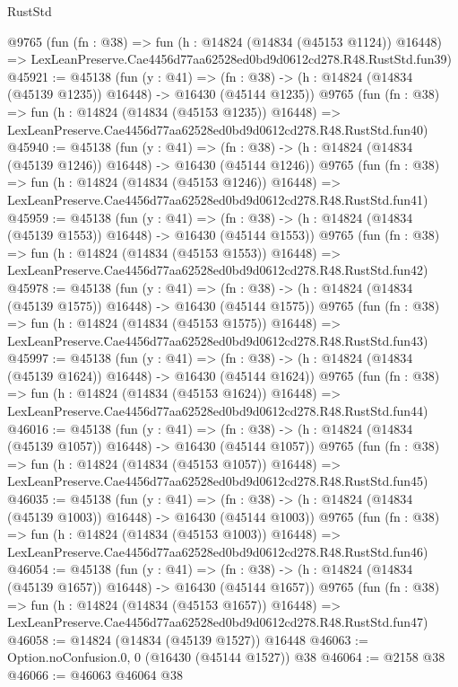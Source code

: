 \begin{lexlean}{RustStd}
\begin{coremodule}
    @9765
    (fun (fn : @38) =>
    fun (h : @14824 (@14834 (@45153 @1124)) @16448) =>
    LexLeanPreserve.Cae4456d77aa62528ed0bd9d0612cd278.R48.RustStd.fun39)
@45921 := @45138
    (fun (y : @41) =>
    (fn : @38) -> (h : @14824 (@14834 (@45139 @1235)) @16448) -> @16430 (@45144 @1235))
    @9765
    (fun (fn : @38) =>
    fun (h : @14824 (@14834 (@45153 @1235)) @16448) =>
    LexLeanPreserve.Cae4456d77aa62528ed0bd9d0612cd278.R48.RustStd.fun40)
@45940 := @45138
    (fun (y : @41) =>
    (fn : @38) -> (h : @14824 (@14834 (@45139 @1246)) @16448) -> @16430 (@45144 @1246))
    @9765
    (fun (fn : @38) =>
    fun (h : @14824 (@14834 (@45153 @1246)) @16448) =>
    LexLeanPreserve.Cae4456d77aa62528ed0bd9d0612cd278.R48.RustStd.fun41)
@45959 := @45138
    (fun (y : @41) =>
    (fn : @38) -> (h : @14824 (@14834 (@45139 @1553)) @16448) -> @16430 (@45144 @1553))
    @9765
    (fun (fn : @38) =>
    fun (h : @14824 (@14834 (@45153 @1553)) @16448) =>
    LexLeanPreserve.Cae4456d77aa62528ed0bd9d0612cd278.R48.RustStd.fun42)
@45978 := @45138
    (fun (y : @41) =>
    (fn : @38) -> (h : @14824 (@14834 (@45139 @1575)) @16448) -> @16430 (@45144 @1575))
    @9765
    (fun (fn : @38) =>
    fun (h : @14824 (@14834 (@45153 @1575)) @16448) =>
    LexLeanPreserve.Cae4456d77aa62528ed0bd9d0612cd278.R48.RustStd.fun43)
@45997 := @45138
    (fun (y : @41) =>
    (fn : @38) -> (h : @14824 (@14834 (@45139 @1624)) @16448) -> @16430 (@45144 @1624))
    @9765
    (fun (fn : @38) =>
    fun (h : @14824 (@14834 (@45153 @1624)) @16448) =>
    LexLeanPreserve.Cae4456d77aa62528ed0bd9d0612cd278.R48.RustStd.fun44)
@46016 := @45138
    (fun (y : @41) =>
    (fn : @38) -> (h : @14824 (@14834 (@45139 @1057)) @16448) -> @16430 (@45144 @1057))
    @9765
    (fun (fn : @38) =>
    fun (h : @14824 (@14834 (@45153 @1057)) @16448) =>
    LexLeanPreserve.Cae4456d77aa62528ed0bd9d0612cd278.R48.RustStd.fun45)
@46035 := @45138
    (fun (y : @41) =>
    (fn : @38) -> (h : @14824 (@14834 (@45139 @1003)) @16448) -> @16430 (@45144 @1003))
    @9765
    (fun (fn : @38) =>
    fun (h : @14824 (@14834 (@45153 @1003)) @16448) =>
    LexLeanPreserve.Cae4456d77aa62528ed0bd9d0612cd278.R48.RustStd.fun46)
@46054 := @45138
    (fun (y : @41) =>
    (fn : @38) -> (h : @14824 (@14834 (@45139 @1657)) @16448) -> @16430 (@45144 @1657))
    @9765
    (fun (fn : @38) =>
    fun (h : @14824 (@14834 (@45153 @1657)) @16448) =>
    LexLeanPreserve.Cae4456d77aa62528ed0bd9d0612cd278.R48.RustStd.fun47)
@46058 := @14824 (@14834 (@45139 @1527)) @16448
@46063 := Option.noConfusion.{0, 0} (@16430 (@45144 @1527)) @38
@46064 := @2158 @38
@46066 := @46063 @46064 @38

\end{coremodule}
\end{lexlean}
